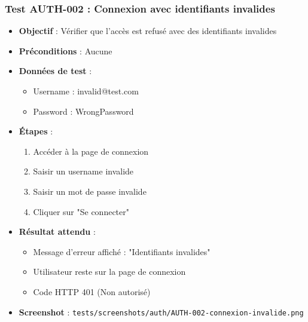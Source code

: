 \subsubsection{Test AUTH-002 : Connexion avec identifiants invalides}
\begin{itemize}
    \item \textbf{Objectif} : Vérifier que l'accès est refusé avec des identifiants invalides
    \item \textbf{Préconditions} : Aucune
    \item \textbf{Données de test} :
        \begin{itemize}
            \item Username : invalid@test.com
            \item Password : WrongPassword
        \end{itemize}
    \item \textbf{Étapes} :
        \begin{enumerate}
            \item Accéder à la page de connexion
            \item Saisir un username invalide
            \item Saisir un mot de passe invalide
            \item Cliquer sur "Se connecter"
        \end{enumerate}
    \item \textbf{Résultat attendu} : 
        \begin{itemize}
            \item Message d'erreur affiché : "Identifiants invalides"
            \item Utilisateur reste sur la page de connexion
            \item Code HTTP 401 (Non autorisé)
        \end{itemize}
    \item \textbf{Screenshot} : \texttt{tests/screenshots/auth/AUTH-002-connexion-invalide.png}
\end{itemize}


